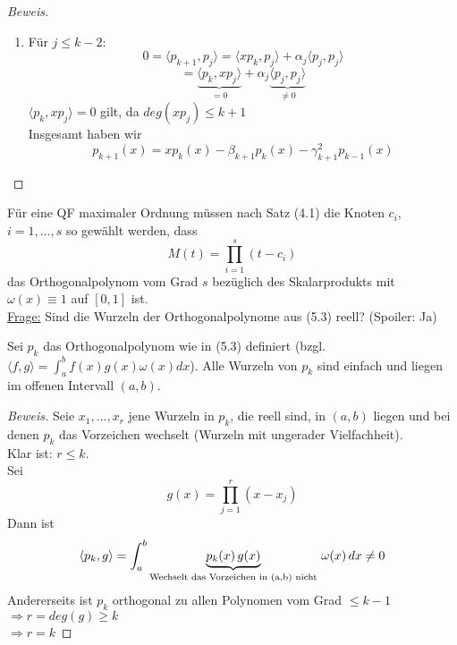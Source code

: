 \begin{theorem}
\begin{proof}[Beweis]
\begin{enumerate}
  \item Für $j \leq k-2$:
    $$ 0 = \langle p_{k+1}, p_{j} \rangle = \langle xp_{k}, p_{j} \rangle + \alpha_j \langle p_{j}, p_{j} \rangle$$
    $$ = \underbrace{\langle p_{k}, xp_{j} \rangle}_{= 0} + \alpha_j \underbrace{\langle p_{j}, p_{j} \rangle}_{\neq 0}$$
    $\langle p_{k}, xp_{j} \rangle = 0$ gilt, da $deg(xp_j) \leq k+1$ \\
    Insgesamt haben wir
    $$p_{k+1}(x) = xp_k(x) - \beta_{k+1}p_k(x) - \gamma_{k+1}^2 p_{k-1}(x)$$
\end{enumerate}
\end{proof}
\end{theorem}

\begin{comment*}
Für eine QF maximaler Ordnung müssen nach Satz (4.1) die Knoten $c_i$, $i=1, ...,s$ so gewählt werden, dass 
$$M(t) = \prod_{i=1}^s(t-c_i)$$
das Orthogonalpolynom vom Grad $s$ bezüglich des Skalarprodukts mit $\omega(x) \equiv 1$ auf $[0,1]$ ist. \\
\underline{Frage:} Sind die Wurzeln der Orthogonalpolynome aus (5.3) reell? (Spoiler: Ja)
\end{comment*}

\begin{theorem}
Sei $p_k$ das Orthogonalpolynom wie in (5.3) definiert (bzgl. $\langle f, g \rangle = \int_a^b f(x)g(x)\omega(x)dx$). Alle Wurzeln von $p_k$ sind einfach und liegen im offenen Intervall $(a,b)$.

\begin{proof}[Beweis]
Seie $x_1, ..., x_r$ jene Wurzeln in $p_k$, die reell sind, in $(a, b)$ liegen und bei denen $p_k$ das Vorzeichen wechselt (Wurzeln mit ungerader Vielfachheit). \\
Klar ist: $r \leq k$. \\
Sei 
$$g(x) = \prod_{j=1}^r (x-x_j)$$ 
Dann ist 
$$ \langle p_k, g \rangle = \int_a^b \underbrace{p_k(x) \thinspace g(x)}_{\text{Wechselt das Vorzeichen in (a,b) nicht}} \thinspace \omega(x) \thinspace dx \neq 0$$
Andererseits ist $p_k$ orthogonal zu allen Polynomen vom Grad $\leq k-1$ \\
$\Rightarrow r = deg(g) \geq k$ \\
$\Rightarrow r=k$
\end{proof}
\end{theorem}

